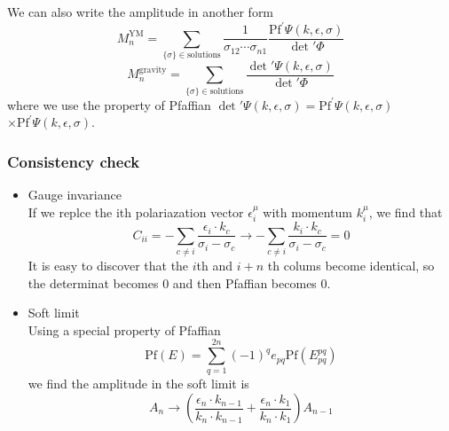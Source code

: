 \documentclass{beamer}
\begin{document}
\begin{frame}
    We can also write the amplitude in another form
    \begin{equation*}
        M_n^{\mathrm{YM}}=\sum_{\{\sigma\}\in\mathrm{solutions}}\frac{1}{\sigma_{12}\cdots\sigma_{n1}}\frac{\mathrm{Pf}^\prime \Psi(k,\epsilon,\sigma)}{\det{'}\Phi}
    \end{equation*}
    \begin{equation*}
        M_n^{\mathrm{gravity}}=\sum_{\{\sigma\}\in\mathrm{solutions}}\frac{\det{'}\Psi(k,\epsilon,\sigma)}{\det{'}\Phi}
    \end{equation*}
    where we use the property of Pfaffian $\det{'}\Psi(k,\epsilon,\sigma)=\mathrm{Pf}^\prime \Psi(k,\epsilon,\sigma)$\\$\times \mathrm{Pf}^\prime \Psi(k,\epsilon,\sigma)$.
\end{frame}
\begin{frame}
    \frametitle{Consistency check}
    \begin{itemize}
        \item \alert{Gauge invariance}\\
        If we replce the ith polariazation vector $\epsilon_i^\mu$ with momentum $k_i^\mu$, we find that
        \begin{equation*}
            C_{ii}=-\sum_{c\neq i}\frac{\epsilon_i\cdot k_c}{\sigma_i-\sigma_c} \to -\sum_{c\neq i}\frac{k_i\cdot k_c}{\sigma_i-\sigma_c}=0
        \end{equation*}
        It is easy to discover that the $i$th and $i+n$ th colums become identical, so the determinat becomes 0 and then Pfaffian becomes 0.
        \pause
        \item \alert{Soft limit}\\
        Using a special property of Pfaffian
        \begin{equation*}
            \mathrm{Pf} (E)=\sum_{q=1}^{2n}(-1)^q e_{pq}\mathrm{Pf}(E^{pq}_{pq})
        \end{equation*}
        we find the amplitude in the soft limit is 
        \begin{equation*}
            A_n\to\left(\frac{\epsilon_n\cdot k_{n-1}}{k_n\cdot k_{n-1}}+\frac{\epsilon_n\cdot k_1}{k_n\cdot k_1}\right)A_{n-1}
        \end{equation*}
    \end{itemize}
\end{frame}
\end{document}
